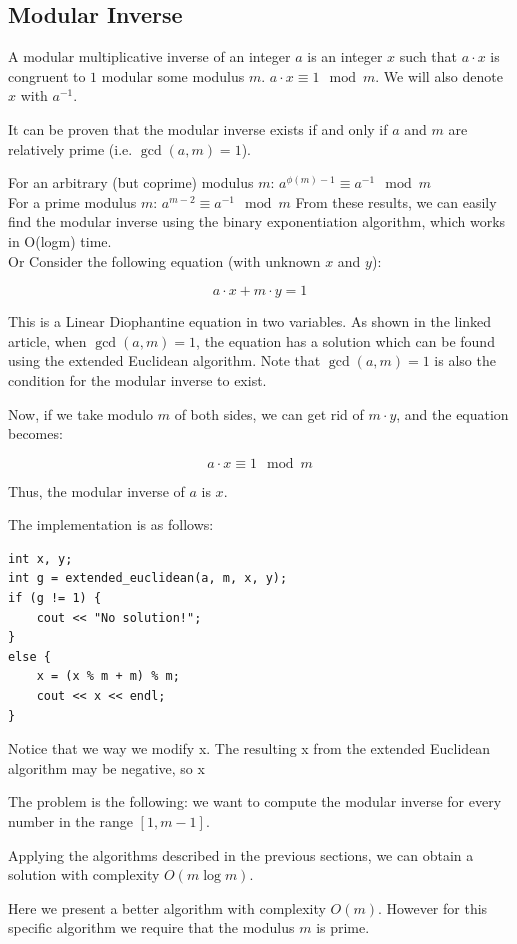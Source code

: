 \documentclass[8pt, a4paper, oneside, twocolumn]{extarticle}
\begin{document}
\subsection{Modular Inverse}
A modular multiplicative inverse of an integer $a$ is an integer $x$ such that $a \cdot x$ is congruent to $1$ modular some modulus $m$. $a \cdot x \equiv 1 \mod m.$ We will also denote $x$ with $a^{-1}$.

It can be proven that the modular inverse exists if and only if $a$ and $m$ are relatively prime (i.e. $\gcd(a, m) = 1$).

For an arbitrary (but coprime) modulus $m$: $a ^ {\phi (m) - 1} \equiv a ^{-1} \mod m$\\
For a prime modulus $m$: $a ^ {m - 2} \equiv a ^ {-1} \mod m$
From these results, we can easily find the modular inverse using the binary exponentiation algorithm, which works in O(logm) time.
\\Or
Consider the following equation (with unknown $x$ and $y$):

$$a \cdot x + m \cdot y = 1$$

This is a Linear Diophantine equation in two variables. As shown in the linked article, when $\gcd(a, m) = 1$, the equation has a solution which can be found using the extended Euclidean algorithm. Note that $\gcd(a, m) = 1$ is also the condition for the modular inverse to exist.

Now, if we take modulo $m$ of both sides, we can get rid of $m \cdot y$, and the equation becomes:

$$a \cdot x \equiv 1 \mod m$$

Thus, the modular inverse of $a$ is $x$.

The implementation is as follows:
\begin{verbatim}
int x, y;
int g = extended_euclidean(a, m, x, y);
if (g != 1) {
    cout << "No solution!";
}
else {
    x = (x % m + m) % m;
    cout << x << endl;
}
\end{verbatim}
Notice that we way we modify x. The resulting x from the extended Euclidean algorithm may be negative, so x %

The problem is the following: we want to compute the modular inverse for every number in the range $[1, m-1]$.

Applying the algorithms described in the previous sections, we can obtain a solution with complexity $O(m \log m)$.

Here we present a better algorithm with complexity $O(m)$. However for this specific algorithm we require that the modulus $m$ is prime.
\end{document}
